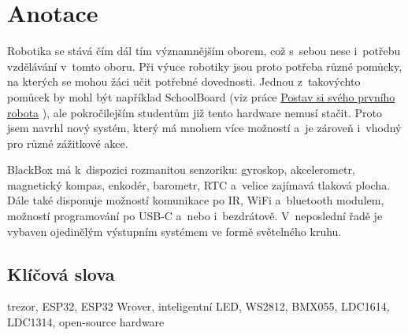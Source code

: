 \documentclass{template/socthesis}
\author{Tomáš Vavrinec} %
\begin{document}
\maketitle



\pagestyle{empty}

\section*{Anotace}
\color{black}

Robotika se stává čím dál tím významnějším oborem, což s~sebou nese i~potřebu vzdělávání v~tomto oboru.
Při výuce robotiky jsou proto potřeba různé pomůcky, na kterých se mohou žáci učit potřebné dovednosti. Jednou z~takovýchto pomůcek 
by mohl být například SchoolBoard 
(viz práce \href{https://github.com/TVavrinec/SOC-text/blob/master/SOC.pdf}{Postav si svého prvního robota} \parencite{soc2020}), 
ale pokročilejším studentům již tento hardware nemusí stačit. 
Proto jsem navrhl nový systém, který má mnohem více možností a~je zároveň 
i~vhodný pro různé zážitkové akce. 

BlackBox má k~dispozici rozmanitou senzoriku:  
gyroskop, akcelerometr, magnetický kompas, enkodér, barometr, RTC a~velice zajímavá tlaková plocha. Dále také disponuje 
možností komunikace po IR, WiFi a~bluetooth modulem, možností programování po USB-C a~nebo i~bezdrátově.
V~neposlední řadě je vybaven ojedinělým výstupním systémem ve formě světelného kruhu.


\subsection*{Klíčová slova}

\color{black}

trezor, ESP32, ESP32 Wrover, inteligentní LED, WS2812, BMX055, LDC1614, LDC1314, open-source hardware

\newpage

\vspace{20mm}
\end{document}
